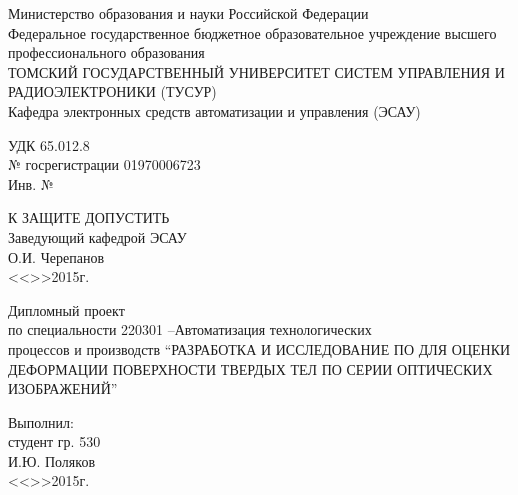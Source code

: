 \newpage
{}

\begin{center}
 Министерство образования и науки Российской Федерации\\
 Федеральное государственное бюджетное образовательное учреждение высшего профессионального образования\\
 ТОМСКИЙ ГОСУДАРСТВЕННЫЙ УНИВЕРСИТЕТ СИСТЕМ УПРАВЛЕНИЯ И РАДИОЭЛЕКТРОНИКИ (ТУСУР)\\
 Кафедра электронных средств автоматизации и управления (ЭСАУ)\\
\end{center}

\begin{minipage}{0.45\textwidth}
 \begin{flushleft}
  УДК 65.012.8 \\
  № госрегистрации 01970006723 \\
  Инв. № \\
 \end{flushleft}
\end{minipage}
\begin{minipage}{0.45\textwidth}
 \begin{flushleft}
  К ЗАЩИТЕ ДОПУСТИТЬ \\
  Заведующий кафедрой ЭСАУ \\
  \underline{\hspace{2.5cm}}О.И. Черепанов \\
  <<\underline{\hspace{1cm}}>>\underline{\hspace{3cm}}2015г.\\
 \end{flushleft}
\end{minipage}

\vspace*{1.5 cm}

\begin{center}
Дипломный проект\\
по специальности 220301 –Автоматизация технологических \\
процессов и производств
``РАЗРАБОТКА И ИССЛЕДОВАНИЕ ПО ДЛЯ ОЦЕНКИ ДЕФОРМАЦИИ ПОВЕРХНОСТИ ТВЕРДЫХ ТЕЛ ПО СЕРИИ ОПТИЧЕСКИХ ИЗОБРАЖЕНИЙ''\\
\end{center}

\vspace*{1.5 cm}

\begin{flushright}
\begin{minipage}{0.45\textwidth}
 \begin{flushleft}
  Выполнил: \\
  студент гр. 530 \\
  \underline{\hspace{3cm}}И.Ю. Поляков \\
  <<\underline{\hspace{1cm}}>>\underline{\hspace{3cm}}2015г.\\
 \end{flushleft}
\end{minipage}
\end{flushright}

